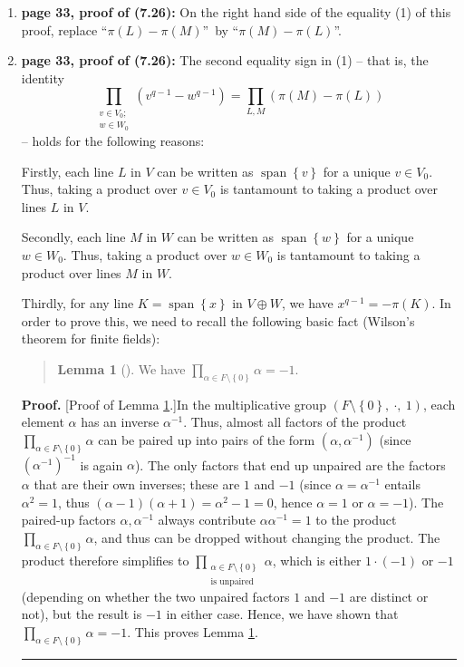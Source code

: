 \documentclass[numbers=enddot,12pt,final,onecolumn,notitlepage]{scrartcl}%
\newenvironment{statement}{\begin{quote}}{\end{quote}}
\theoremstyle{definition}
\newtheorem{lem}[theo]{Lemma}
\newenvironment{lemmain}[1][]
{\begin{statement}\begin{lem}[#1]}
{\end{lem}\end{statement}}
\newenvironment{proof}[1][Proof]{\noindent\textbf{#1.} }{\ \rule{0.5em}{0.5em}}
\newenvironment{lemmain}[1][Proof]{\noindent\textbf{#1.} }{\ \rule{0.5em}{0.5em}}
\let\prodnonlimits\prod
\renewcommand{\prod}{\prodnonlimits\limits}
\begin{document}
\begin{enumerate}
\item \textbf{page 33, proof of (7.26):} On the right hand side of the
equality (1) of this proof, replace \textquotedblleft$\pi\left(  L\right)
-\pi\left(  M\right)  $\textquotedblright\ by \textquotedblleft$\pi\left(
M\right)  -\pi\left(  L\right)  $\textquotedblright.

\item \textbf{page 33, proof of (7.26):} The second equality sign in (1) --
that is, the identity%
\[
\prod_{\substack{v\in V_{0};\\w\in W_{0}}}\left(  v^{q-1}-w^{q-1}\right)
=\prod_{L,M}\left(  \pi\left(  M\right)  -\pi\left(  L\right)  \right)
\]
-- holds for the following reasons:

Firstly, each line $L$ in $V$ can be written as $\operatorname*{span}\left\{
v\right\}  $ for a unique $v\in V_{0}$. Thus, taking a product over $v\in
V_{0}$ is tantamount to taking a product over lines $L$ in $V$.

Secondly, each line $M$ in $W$ can be written as $\operatorname*{span}\left\{
w\right\}  $ for a unique $w\in W_{0}$. Thus, taking a product over $w\in
W_{0}$ is tantamount to taking a product over lines $M$ in $W$.

Thirdly, for any line $K=\operatorname*{span}\left\{  x\right\}  $ in $V\oplus
W$, we have $x^{q-1}=-\pi\left(  K\right)  $. In order to prove this, we need
to recall the following basic fact (Wilson's theorem for finite fields):

\begin{lemmain}
\label{lem.wilson-F}We have $\prod_{\alpha\in F\setminus\left\{  0\right\}
}\alpha=-1$.
\end{lemmain}

\begin{proof}
[Proof of Lemma \ref{lem.wilson-F}.]In the multiplicative group $\left(
F\setminus\left\{  0\right\}  ,\ \cdot,\ 1\right)  $, each element $\alpha$
has an inverse $\alpha^{-1}$. Thus, almost all factors of the product
$\prod_{\alpha\in F\setminus\left\{  0\right\}  }\alpha$ can be paired up into
pairs of the form $\left(  \alpha,\alpha^{-1}\right)  $ (since $\left(
\alpha^{-1}\right)  ^{-1}$ is again $\alpha$). The only factors that end up
unpaired are the factors $\alpha$ that are their own inverses; these are $1$
and $-1$ (since $\alpha=\alpha^{-1}$ entails $\alpha^{2}=1$, thus $\left(
\alpha-1\right)  \left(  \alpha+1\right)  =\alpha^{2}-1=0$, hence $\alpha=1$
or $\alpha=-1$). The paired-up factors $\alpha,\alpha^{-1}$ always contribute
$\alpha\alpha^{-1}=1$ to the product $\prod_{\alpha\in F\setminus\left\{
0\right\}  }\alpha$, and thus can be dropped without changing the product. The
product therefore simplifies to $\prod_{\substack{\alpha\in F\setminus\left\{
0\right\}  \\\text{is unpaired}}}\alpha$, which is either $1\cdot\left(
-1\right)  $ or $-1$ (depending on whether the two unpaired factors $1$ and
$-1$ are distinct or not), but the result is $-1$ in either case. Hence, we
have shown that $\prod_{\alpha\in F\setminus\left\{  0\right\}  }\alpha=-1$.
This proves Lemma \ref{lem.wilson-F}.
\end{proof}


\end{enumerate}
\end{document}

